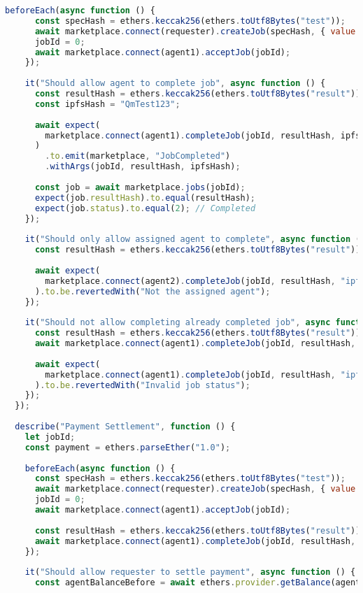 \begin{lstlisting}[language=JavaScript,caption={Complete test suite for smart contracts}]
    beforeEach(async function () {
      const specHash = ethers.keccak256(ethers.toUtf8Bytes("test"));
      await marketplace.connect(requester).createJob(specHash, { value: payment });
      jobId = 0;
      await marketplace.connect(agent1).acceptJob(jobId);
    });
    
    it("Should allow agent to complete job", async function () {
      const resultHash = ethers.keccak256(ethers.toUtf8Bytes("result"));
      const ipfsHash = "QmTest123";
      
      await expect(
        marketplace.connect(agent1).completeJob(jobId, resultHash, ipfsHash)
      )
        .to.emit(marketplace, "JobCompleted")
        .withArgs(jobId, resultHash, ipfsHash);
      
      const job = await marketplace.jobs(jobId);
      expect(job.resultHash).to.equal(resultHash);
      expect(job.status).to.equal(2); // Completed
    });
    
    it("Should only allow assigned agent to complete", async function () {
      const resultHash = ethers.keccak256(ethers.toUtf8Bytes("result"));
      
      await expect(
        marketplace.connect(agent2).completeJob(jobId, resultHash, "ipfs")
      ).to.be.revertedWith("Not the assigned agent");
    });
    
    it("Should not allow completing already completed job", async function () {
      const resultHash = ethers.keccak256(ethers.toUtf8Bytes("result"));
      await marketplace.connect(agent1).completeJob(jobId, resultHash, "ipfs");
      
      await expect(
        marketplace.connect(agent1).completeJob(jobId, resultHash, "ipfs2")
      ).to.be.revertedWith("Invalid job status");
    });
  });
  
  describe("Payment Settlement", function () {
    let jobId;
    const payment = ethers.parseEther("1.0");
    
    beforeEach(async function () {
      const specHash = ethers.keccak256(ethers.toUtf8Bytes("test"));
      await marketplace.connect(requester).createJob(specHash, { value: payment });
      jobId = 0;
      await marketplace.connect(agent1).acceptJob(jobId);
      
      const resultHash = ethers.keccak256(ethers.toUtf8Bytes("result"));
      await marketplace.connect(agent1).completeJob(jobId, resultHash, "ipfs");
    });
    
    it("Should allow requester to settle payment", async function () {
      const agentBalanceBefore = await ethers.provider.getBalance(agent1.address);
      

\end{lstlisting}
